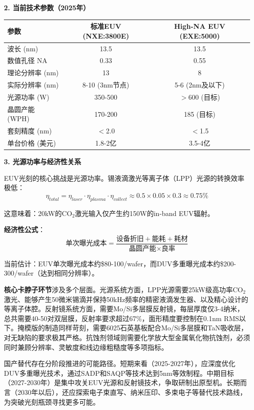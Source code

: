 \textbf{2. 当前技术参数（2025年）}

\begin{table}[H]
\centering
\small
\begin{tabular}{lcc}
\toprule
\textbf{参数} & \textbf{标准EUV (NXE:3800E)} & \textbf{High-NA EUV (EXE:5000)} \\
\midrule
波长 (nm) & 13.5 & 13.5 \\
数值孔径 NA & 0.33 & 0.55 \\
理论分辨率 (nm) & 13 & 8 \\
实际分辨率 (nm) & 8-10 (3nm节点) & 5-6 (2nm及以下) \\
光源功率 (W) & 350-500 & $>$600 (目标) \\
晶圆产能 (WPH) & 170-200 & 185 (目标) \\
套刻精度 (nm) & $<$2.0 & $<$1.5 \\
单台价格 (美元) & 1.8-2亿 & 3.5-4亿 \\
\bottomrule
\end{tabular}
\end{table}

\textbf{3. 光源功率与经济性关系}

EUV光刻的核心挑战是光源功率。锡液滴激光等离子体（LPP）光源的转换效率极低：
\begin{equation}
\eta_{total} = \eta_{laser} \cdot \eta_{plasma} \cdot \eta_{collect} \approx 0.5 \times 0.05 \times 0.3 \approx 0.75\%
\end{equation}

这意味着：20kW的CO$_2$激光输入仅产生约150W的in-band EUV辐射。

\textbf{经济性公式}：
\begin{equation}
\text{单次曝光成本} = \frac{\text{设备折旧} + \text{能耗} + \text{耗材}}{\text{晶圆产能} \times \text{良率}}
\end{equation}

当前估计：EUV单次曝光成本约\$80-100/wafer，而DUV多重曝光成本约\$200-300/wafer（达到相同分辨率）。

\textbf{核心卡脖子环节}涉及多个层面。光源系统方面，LPP光源需要25kW级高功率CO$_2$激光、能够产生50微米锡滴并保持50kHz频率的精密液滴发生器、以及精心设计的等离子体腔。反射镜系统方面，需要Mo/Si多层膜反射镜，每层厚度仅3-4纳米，总共需要40-50对双层膜，反射率要求超过67\%，面形精度要控制在0.1nm RMS以下。掩模版的制造同样苛刻，需要6025石英基板配合Mo/Si多层膜和TaN吸收层，对无缺陷的要求极其严格。抗蚀剂领域则需要化学放大型金属氧化物抗蚀剂，必须同时兼顾分辨率、灵敏度和线边缘粗糙度等多项指标。

国产替代存在分阶段推进的可能路径。短期来看（2025-2027年），应深度优化DUV多重曝光技术，通过SADP和SAQP等技术达到5nm等效制程。中期目标（2027-2030年）是集中攻关EUV光源和反射镜技术，争取研制出原型机。长期而言（2030年以后），还应探索电子束直写、纳米压印、多束电子等替代技术路线，为突破光刻瓶颈寻找更多可能。

